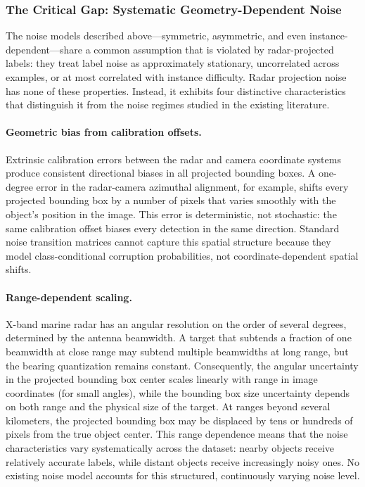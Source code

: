 

\subsubsection{The Critical Gap: Systematic Geometry-Dependent Noise}\label{subsubsec:systematic_noise}

The noise models described above---symmetric, asymmetric, and even instance-dependent---share a common assumption that is violated by radar-projected labels: they treat label noise as approximately stationary, uncorrelated across examples, or at most correlated with instance difficulty. Radar projection noise has none of these properties. Instead, it exhibits four distinctive characteristics that distinguish it from the noise regimes studied in the existing literature.

\paragraph{Geometric bias from calibration offsets.} Extrinsic calibration errors between the radar and camera coordinate systems produce consistent directional biases in all projected bounding boxes. A one-degree error in the radar-camera azimuthal alignment, for example, shifts every projected bounding box by a number of pixels that varies smoothly with the object's position in the image. This error is deterministic, not stochastic: the same calibration offset biases every detection in the same direction. Standard noise transition matrices cannot capture this spatial structure because they model class-conditional corruption probabilities, not coordinate-dependent spatial shifts.

\paragraph{Range-dependent scaling.} X-band marine radar has an angular resolution on the order of several degrees, determined by the antenna beamwidth. A target that subtends a fraction of one beamwidth at close range may subtend multiple beamwidths at long range, but the bearing quantization remains constant. Consequently, the angular uncertainty in the projected bounding box center scales linearly with range in image coordinates (for small angles), while the bounding box size uncertainty depends on both range and the physical size of the target. At ranges beyond several kilometers, the projected bounding box may be displaced by tens or hundreds of pixels from the true object center. This range dependence means that the noise characteristics vary systematically across the dataset: nearby objects receive relatively accurate labels, while distant objects receive increasingly noisy ones. No existing noise model accounts for this structured, continuously varying noise level.

